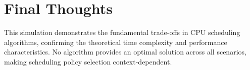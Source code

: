 \documentclass[12pt,a4paper]{report}
\begin{document}
\section{Final Thoughts}
This simulation demonstrates the fundamental trade-offs in CPU scheduling algorithms, confirming the theoretical time complexity and performance characteristics. No algorithm provides an optimal solution across all scenarios, making scheduling policy selection context-dependent.
\end{document}
